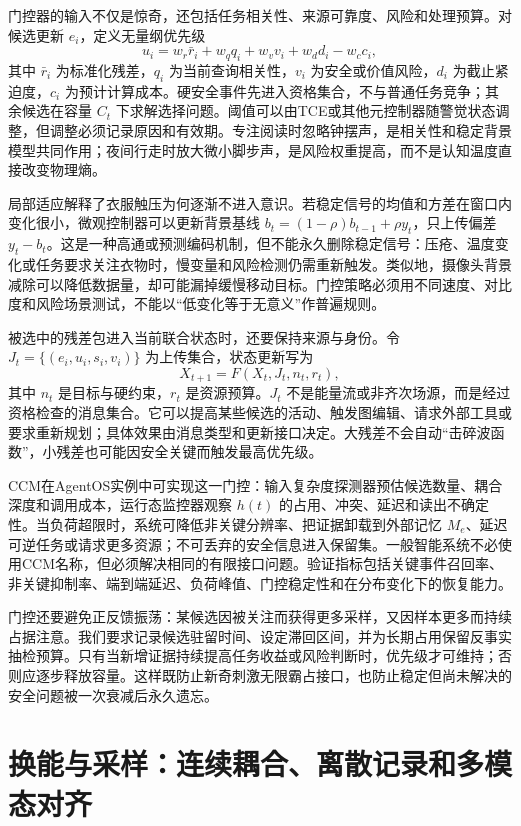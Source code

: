 门控器的输入不仅是惊奇，还包括任务相关性、来源可靠度、风险和处理预算。对候选更新 $e_i$，定义无量纲优先级
\[
u_i=w_r\bar r_i+w_q q_i+w_v v_i+w_d d_i-w_c c_i,
\]
其中 $\bar r_i$ 为标准化残差，$q_i$ 为当前查询相关性，$v_i$ 为安全或价值风险，$d_i$ 为截止紧迫度，$c_i$ 为预计计算成本。硬安全事件先进入资格集合，不与普通任务竞争；其余候选在容量 $C_t$ 下求解选择问题。阈值可以由TCE或其他元控制器随警觉状态调整，但调整必须记录原因和有效期。专注阅读时忽略钟摆声，是相关性和稳定背景模型共同作用；夜间行走时放大微小脚步声，是风险权重提高，而不是认知温度直接改变物理熵。

局部适应解释了衣服触压为何逐渐不进入意识。若稳定信号的均值和方差在窗口内变化很小，微观控制器可以更新背景基线 $b_t=(1-\rho)b_{t-1}+\rho y_t$，只上传偏差 $y_t-b_t$。这是一种高通或预测编码机制，但不能永久删除稳定信号：压疮、温度变化或任务要求关注衣物时，慢变量和风险检测仍需重新触发。类似地，摄像头背景减除可以降低数据量，却可能漏掉缓慢移动目标。门控策略必须用不同速度、对比度和风险场景测试，不能以“低变化等于无意义”作普遍规则。

被选中的残差包进入当前联合状态时，还要保持来源与身份。令 $J_t=\{(e_i,u_i,s_i,v_i)\}$ 为上传集合，状态更新写为
\[
X_{t+1}=F(X_t,J_t,n_t,r_t),
\]
其中 $n_t$ 是目标与硬约束，$r_t$ 是资源预算。$J_t$ 不是能量流或非齐次场源，而是经过资格检查的消息集合。它可以提高某些候选的活动、触发图编辑、请求外部工具或要求重新规划；具体效果由消息类型和更新接口决定。大残差不会自动“击碎波函数”，小残差也可能因安全关键而触发最高优先级。

CCM在AgentOS实例中可实现这一门控：输入复杂度探测器预估候选数量、耦合深度和调用成本，运行态监控器观察 $h(t)$ 的占用、冲突、延迟和读出不确定性。当负荷超限时，系统可降低非关键分辨率、把证据卸载到外部记忆 $M_e$、延迟可逆任务或请求更多资源；不可丢弃的安全信息进入保留集。一般智能系统不必使用CCM名称，但必须解决相同的有限接口问题。验证指标包括关键事件召回率、非关键抑制率、端到端延迟、负荷峰值、门控稳定性和在分布变化下的恢复能力。

门控还要避免正反馈振荡：某候选因被关注而获得更多采样，又因样本更多而持续占据注意。我们要求记录候选驻留时间、设定滞回区间，并为长期占用保留反事实抽检预算。只有当新增证据持续提高任务收益或风险判断时，优先级才可维持；否则应逐步释放容量。这样既防止新奇刺激无限霸占接口，也防止稳定但尚未解决的安全问题被一次衰减后永久遗忘。

\section{换能与采样：连续耦合、离散记录和多模态对齐}
\label{sec:section_156}

